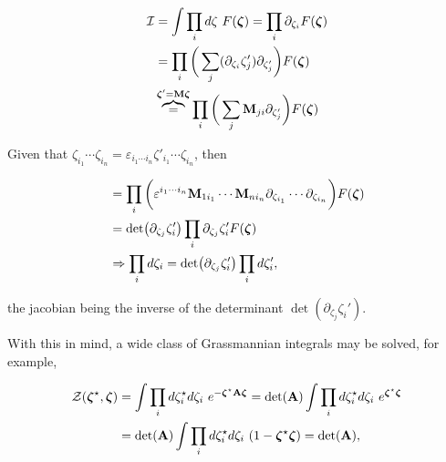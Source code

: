\begin{itemize}
\begin{tcolorbox}[colback=yellow!10!white,colframe=red!75!black,lowerbox=invisible, title = Transformation of Grassmann variables ]
\begin{equation}
    \begin{split}
        \mathcal{I} &= \int \prod_{i} d\zeta \textnormal{ } F(\bm{\zeta}) = \prod_{i} \partial_{\zeta_i} F(\bm{\zeta}) \\
        &= \prod_{i} \bigg(\sum_{j} (\partial_{\zeta_i} \zeta_j') \partial_{\zeta_j'}\bigg) F(\bm{\zeta})\\
        & \overbrace{=}^{\bm{\zeta}' = {\bf M} \bm{\zeta}} \prod_{i} \bigg(\sum_{j} {{\bf M}}_{ji} \partial_{\zeta_j'}\bigg) F(\bm{\zeta})\\
     \end{split} 
\end{equation}

Given that $\zeta_{i_1} \cdots \zeta_{i_n} = \varepsilon_{i_1 \cdots i_n} \zeta'_{i_1} \cdots \zeta_{i_n} $, then

\begin{equation}
    \begin{split}
        &= \prod_{i} \bigg(\varepsilon^{i_1 \cdots i_n} {{\bf M}}_{1i_1} \cdots  {{\bf M}}_{ni_n} \partial_{\zeta_{ i_1}} \cdots \partial_{\zeta_{i_n}} \bigg) F(\bm{\zeta}) \\
        &= \det(\partial_{\zeta_j} \zeta_i') \prod_{i} \partial_{\zeta_j} \zeta_i' F(\bm{\zeta}) \\
        &\Rightarrow \prod_{i} d\zeta_i = \det(\partial_{\zeta_j} \zeta_i') \prod_{i} d{\zeta_i'},
    \end{split}
\end{equation}

the jacobian being the inverse of the determinant $\det(\partial_{\zeta_j} \zeta_i')$.
\end{tcolorbox}

With this in mind, a wide class of Grassmannian integrals may be solved, for example, 

\begin{equation}
\begin{split}
    \mathcal{Z}(\bm{\zeta}^\star,\bm{\zeta}) &= \int \prod_{i} d{\zeta}_i^\star d{\zeta}_i \textnormal{ } e^{- \bm{\zeta}^\star {\bf A} \bm{\zeta}} = \det (\bf A) \int \prod_{i} d{\zeta}_i^\star d{\zeta}_i \textnormal{ } e^{\bm{\zeta}^\star \bm{\zeta}} \\
    &= \det (\bf A) \int \prod_{i} d{\zeta}_i^\star d{\zeta}_i \textnormal{ } (1 - {\bm{\zeta}^\star \bm{\zeta}}) = \det (\bf A),
\end{split}
\end{equation}
\end{itemize}

